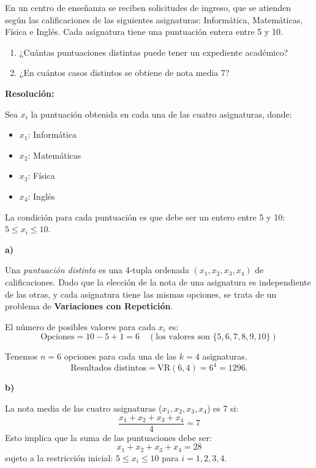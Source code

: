 \documentclass[a4paper,12pt]{article}
\begin{document}
\begin{ejercicio}[title=Ejercicio 36]
En un centro de enseñanza se reciben solicitudes de ingreso, que se atienden según las calificaciones de las siguientes asignaturas:  
Informática, Matemáticas, Física e Inglés. Cada asignatura tiene una puntuación entera entre 5 y 10.

\begin{enumerate}
\item[a)] ¿Cuántas puntuaciones distintas puede tener un expediente académico?
\item[b)] ¿En cuántos casos distintos se obtiene de nota media 7?
\end{enumerate}

\tcblower
\textbf{Resolución:}

Sea $x_i$ la puntuación obtenida en cada una de las cuatro asignaturas, donde:
\begin{itemize}
    \item $x_1$: Informática
    \item $x_2$: Matemáticas
    \item $x_3$: Física
    \item $x_4$: Inglés
\end{itemize}
La condición para cada puntuación es que debe ser un entero entre 5 y 10: $5 \le x_i \le 10$.

\bigskip

\textbf{a)}

Una \textit{puntuación distinta} es una 4-tupla ordenada $(x_1, x_2, x_3, x_4)$ de calificaciones. Dado que la elección de la nota de una asignatura es independiente de las otras, y cada asignatura tiene las mismas opciones, se trata de un problema de \textbf{Variaciones con Repetición}.

El número de posibles valores para cada $x_i$ es:
$$ \text{Opciones} = 10 - 5 + 1 = 6 \quad (\text{los valores son } \{5, 6, 7, 8, 9, 10\}) $$

Tenemos $n=6$ opciones para cada una de las $k=4$ asignaturas.
\[
\text{Resultados distintos} = \mathrm{VR}(6, 4) = 6^4 = \boxed{1296}.
\]

\bigskip

\textbf{b)}

La nota media de las cuatro asignaturas ($x_1, x_2, x_3, x_4$) es 7 si:
\[
\frac{x_1 + x_2 + x_3 + x_4}{4} = 7
\]
Esto implica que la suma de las puntuaciones debe ser:
\[
x_1 + x_2 + x_3 + x_4 = 28
\]
sujeto a la restricción inicial: $5 \le x_i \le 10$ para $i=1, 2, 3, 4$.

\end{ejercicio}
\end{document}
